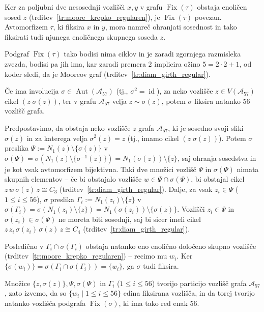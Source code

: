\documentclass[fin1, tisk]{fmfdelo}
\newcommand{\asch}{\mathscr{A}_{57}}
\newcommand{\fix}{\operatorname{Fix}}
\newcommand{\aut}{\operatorname{Aut}}
\newcommand{\id}{\operatorname{id}}
\begin{document}
\begin{dokaz}
    Ker za poljubni dve nesosednji vozlišči $x, y$ v grafu $\fix(\tau)$
    obstaja enoličen sosed $z$ (trditev~\ref{tr:moore_krepko_regularen}), je $\fix(\tau)$ povezan.
    Avtomorfizem $\tau$, ki fiksira $x$ in $y$, mora namreč ohranjati sosednost
    in tako fiksirati tudi njunega enoličnega skupnega soseda $z$.

    Podgraf $\fix(\tau)$ tako
    bodisi nima ciklov in je zaradi zgornjega razmisleka zvezda,
    bodisi pa jih ima, kar zaradi premera $2$ implicira
    ožino $5 = 2\cdot 2 + 1$, od koder sledi, da je Mooreov graf (trditev~\ref{tr:diam_girth_regular}).
\end{dokaz}

\begin{lema}\label{le:cikel_involucija_fiksira_56}
    Če ima involucija $\sigma\in\aut(\asch)$ (tj., $\sigma^2 = \id$), 
    za neko vozlišče $z \in V(\asch)$ cikel $(z\; \sigma(z))$,
    ter v grafu $\asch$ velja $z \sim \sigma(z)$, potem $\sigma$ fiksira natanko $56$ vozlišč grafa.
\end{lema}

\begin{dokaz}
    Predpostavimo, da obstaja neko vozlišče $z$
    grafa $\asch$, ki je sosedno svoji sliki $\sigma(z)$ in za katerega velja $\sigma^2(z) = z$ 
    (tj., imamo cikel $(z\; \sigma(z))$). 
    Potem $\sigma$ preslika $\Psi := N_1(z) \setminus \{\sigma(z)\}$ v 
    $\sigma(\Psi) = \sigma(N_1(z) \setminus \{\sigma^{-1}(z)\}) = N_1(\sigma(z)) \setminus \{z\}$, 
    saj ohranja sosedstva in je kot vsak avtomorfizem bijektivna. 
    Taki dve množici vozlišč $\Psi$ in $\sigma(\Psi)$ nimata skupnih elementov
    -- če bi obstajalo vozlišče $w \in \Psi \cap \sigma(\Psi)$,
    bi obstajal cikel
    $z \, w \, \sigma(z) \, z \cong C_3$ (trditev~\ref{tr:diam_girth_regular}).
    Dalje, za vsak $z_i \in \Psi$ ($1 \leq i \leq 56$), 
    $\sigma$ preslika $\Gamma_i := N_1(z_i) \setminus \{z\}$ v 
    $\sigma(\Gamma_i) = \sigma(N_1(z_i) \setminus \{z\}) = N_1(\sigma(z_i)) \setminus \{\sigma(z)\}$.
    Vozlišči $z_i \in \Psi$ in $\sigma(z_i) \in \sigma(\Psi)$ ne moreta
    biti sosednji, saj bi sicer imeli cikel $z \, z_i \, \sigma(z_i) \, \sigma(z) \, z \cong C_4$
    (trditev~\ref{tr:diam_girth_regular}).

    Posledično v $\Gamma_i \cap \sigma(\Gamma_i)$ obstaja natanko eno enolično določeno 
    skupno voz\-li\-šče (trditev~\ref{tr:moore_krepko_regularen})
    -- recimo mu $w_i$. Ker $\{\sigma(w_i)\} = \sigma(\Gamma_i \cap \sigma(\Gamma_i)) = \{w_i\}$,
    ga $\sigma$ tudi fiksira.
    
    Množice $\{z, \sigma(z)\}, \Psi, \sigma(\Psi)$ in $\Gamma_i$ ($1 \leq i \leq 56$)
    tvorijo particijo vozlišč grafa $\asch$, zato izvemo, da so $\{w_i\mid 1 \leq i \leq 56\}$ edina fiksirana vozlišča,
    in da torej tvorijo natanko vozlišča
    podgrafa
    $\fix(\sigma)$, ki ima tako red enak $56$.
\end{dokaz}
\end{document}
